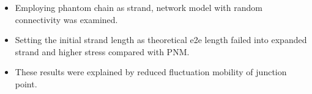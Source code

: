 \begin{columns}[totalwidth=.85\linewidth]
    \column{\textwidth}
    \vspace{-10mm}
        \begin{itemize}
            \item Employing phantom chain as strand, network model with random connectivity was examined.
            \item Setting the initial strand length as theoretical e2e length failed into expanded strand and higher stress compared with PNM.
            \item These results were explained by reduced fluctuation mobility of junction point.
        \end{itemize}
    \end{columns}